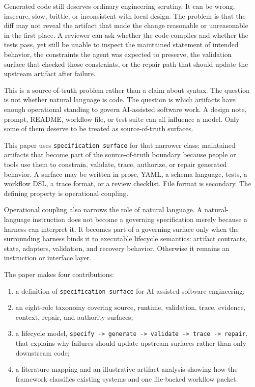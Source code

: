 \documentclass[
]{article}
\providecommand{\tightlist}{%
  \setlength{\itemsep}{0pt}\setlength{\parskip}{0pt}}
\begin{document}
Generated code still deserves ordinary engineering scrutiny. It can be
wrong, insecure, slow, brittle, or inconsistent with local design. The
problem is that the diff may not reveal the artifact that made the
change reasonable or unreasonable in the first place. A reviewer can ask
whether the code compiles and whether the tests pass, yet still be
unable to inspect the maintained statement of intended behavior, the
constraints the agent was expected to preserve, the validation surface
that checked those constraints, or the repair path that should update
the upstream artifact after failure.

This is a source-of-truth problem rather than a claim about syntax. The
question is not whether natural language is code. The question is which
artifacts have enough operational standing to govern AI-assisted
software work. A design note, prompt, README, workflow file, or test
suite can all influence a model. Only some of them deserve to be treated
as source-of-truth surfaces.

This paper uses \texttt{specification\ surface} for that narrower class:
maintained artifacts that become part of the source-of-truth boundary
because people or tools use them to constrain, validate, trace,
authorize, or repair generated behavior. A surface may be written in
prose, YAML, a schema language, tests, a workflow DSL, a trace format,
or a review checklist. File format is secondary. The defining property
is operational coupling.

Operational coupling also narrows the role of natural language. A
natural-language instruction does not become a governing specification
merely because a harness can interpret it. It becomes part of a
governing surface only when the surrounding harness binds it to
executable lifecycle semantics: artifact contracts, state, adapters,
validation, and recovery behavior. Otherwise it remains an instruction
or interface layer.

The paper makes four contributions:

\begin{enumerate}
\def\labelenumi{\arabic{enumi}.}
\tightlist
\item
  a definition of \texttt{specification\ surface} for AI-assisted
  software engineering;
\item
  an eight-role taxonomy covering source, runtime, validation, trace,
  evidence, context, repair, and authority surfaces;
\item
  a lifecycle model,
  \texttt{specify\ -\textgreater{}\ generate\ -\textgreater{}\ validate\ -\textgreater{}\ trace\ -\textgreater{}\ repair},
  that explains why failures should update upstream surfaces rather than
  only downstream code;
\item
  a literature mapping and an illustrative artifact analysis showing how
  the framework classifies existing systems and one file-backed workflow
  packet.
\end{enumerate}
\end{document}
